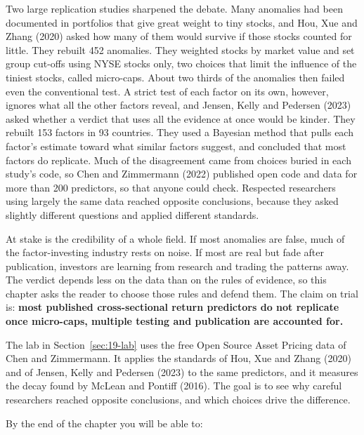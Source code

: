 Two large replication studies sharpened the debate. Many anomalies had been documented in portfolios that give great weight to tiny stocks, and Hou, Xue and Zhang (2020) asked how many of them would survive if those stocks counted for little. They rebuilt 452 anomalies. They weighted stocks by market value and set group cut-offs using NYSE stocks only, two choices that limit the influence of the tiniest stocks, called micro-caps. About two thirds of the anomalies then failed even the conventional test. A strict test of each factor on its own, however, ignores what all the other factors reveal, and Jensen, Kelly and Pedersen (2023) asked whether a verdict that uses all the evidence at once would be kinder. They rebuilt 153 factors in 93 countries. They used a Bayesian method that pulls each factor's estimate toward what similar factors suggest, and concluded that most factors do replicate. Much of the disagreement came from choices buried in each study's code, so Chen and Zimmermann (2022) published open code and data for more than 200 predictors, so that anyone could check. Respected researchers using largely the same data reached opposite conclusions, because they asked slightly different questions and applied different standards.

At stake is the credibility of a whole field. If most anomalies are false, much of the factor-investing industry rests on noise. If most are real but fade after publication, investors are learning from research and trading the patterns away. The verdict depends less on the data than on the rules of evidence, so this chapter asks the reader to choose those rules and defend them. The claim on trial is: \textbf{most published cross-sectional return predictors do not replicate once micro-caps, multiple testing and publication are accounted for.}

The lab in Section~\ref{sec:19-lab} uses the free Open Source Asset Pricing data of Chen and Zimmermann. It applies the standards of Hou, Xue and Zhang (2020) and of Jensen, Kelly and Pedersen (2023) to the same predictors, and it measures the decay found by McLean and Pontiff (2016). The goal is to see why careful researchers reached opposite conclusions, and which choices drive the difference.

By the end of the chapter you will be able to:

